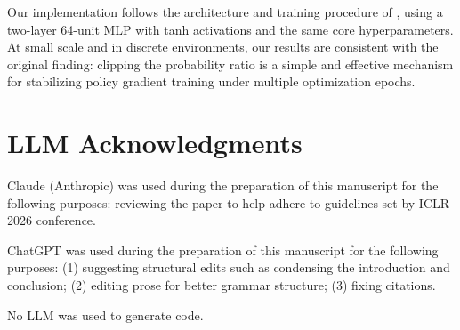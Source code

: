 \documentclass{article}
\begin{document}
Our implementation follows the architecture and training procedure of \citet{schulman2017ppo}, using a two-layer 64-unit MLP with tanh activations and the same core hyperparameters. At small scale and in discrete environments, our results are consistent with the original finding: clipping the probability ratio is a simple and effective mechanism for stabilizing policy gradient training under multiple optimization epochs.

\section*{LLM Acknowledgments}
Claude (Anthropic) was used during the preparation of this manuscript for the following purposes: reviewing the paper to help adhere to guidelines set by ICLR 2026 conference. 

ChatGPT was used during the preparation of this manuscript for the following purposes: (1) suggesting structural edits such as condensing the introduction and conclusion; (2) editing prose for better grammar structure; (3) fixing citations.

No LLM was used to generate code.




\end{document}
